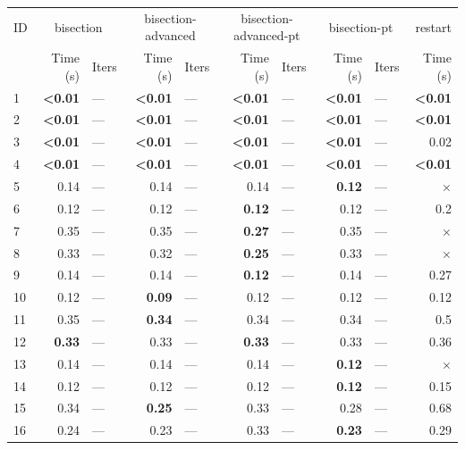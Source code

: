 \begin{longtable}{lr@{\hskip 4pt}l@{\hskip 12pt}r@{\hskip 4pt}l@{\hskip 12pt}r@{\hskip 4pt}l@{\hskip 12pt}r@{\hskip 4pt}l@{\hskip 12pt}r}
\toprule
ID & \multicolumn{2}{c}{bisection} & \multicolumn{2}{c}{bisection-advanced} & \multicolumn{2}{c}{bisection-advanced-pt} & \multicolumn{2}{c}{bisection-pt} & restart \\
\cmidrule(lr){2-3}\cmidrule(lr){4-5}\cmidrule(lr){6-7}\cmidrule(lr){8-9}\cmidrule(lr){10-10}
 & Time (s) &  Iters & Time (s) &  Iters & Time (s) &  Iters & Time (s) &  Iters & Time (s) \\
\midrule
\endhead
1 & \textbf{<0.01} & --- & \textbf{<0.01} & --- & \textbf{<0.01} & --- & \textbf{<0.01} & --- & \textbf{<0.01} \\
2 & \textbf{<0.01} & --- & \textbf{<0.01} & --- & \textbf{<0.01} & --- & \textbf{<0.01} & --- & \textbf{<0.01} \\
\cmidrule{2-10}
3 & \textbf{<0.01} & --- & \textbf{<0.01} & --- & \textbf{<0.01} & --- & \textbf{<0.01} & --- & 0.02 \\
4 & \textbf{<0.01} & --- & \textbf{<0.01} & --- & \textbf{<0.01} & --- & \textbf{<0.01} & --- & \textbf{<0.01} \\
\midrule
5 & 0.14 & --- & 0.14 & --- & 0.14 & --- & \textbf{0.12} & --- & $\times$ \\
6 & 0.12 & --- & 0.12 & --- & \textbf{0.12} & --- & 0.12 & --- & 0.2 \\
7 & 0.35 & --- & 0.35 & --- & \textbf{0.27} & --- & 0.35 & --- & $\times$ \\
8 & 0.33 & --- & 0.32 & --- & \textbf{0.25} & --- & 0.33 & --- & $\times$ \\
\cmidrule{2-10}
9 & 0.14 & --- & 0.14 & --- & \textbf{0.12} & --- & 0.14 & --- & 0.27 \\
10 & 0.12 & --- & \textbf{0.09} & --- & 0.12 & --- & 0.12 & --- & 0.12 \\
11 & 0.35 & --- & \textbf{0.34} & --- & 0.34 & --- & 0.34 & --- & 0.5 \\
12 & \textbf{0.33} & --- & 0.33 & --- & \textbf{0.33} & --- & 0.33 & --- & 0.36 \\
\cmidrule{2-10}
13 & 0.14 & --- & 0.14 & --- & 0.14 & --- & \textbf{0.12} & --- & $\times$ \\
14 & 0.12 & --- & 0.12 & --- & 0.12 & --- & \textbf{0.12} & --- & 0.15 \\
15 & 0.34 & --- & \textbf{0.25} & --- & 0.33 & --- & 0.28 & --- & 0.68 \\
16 & 0.24 & --- & 0.23 & --- & 0.33 & --- & \textbf{0.23} & --- & 0.29 \\

\end{longtable}
